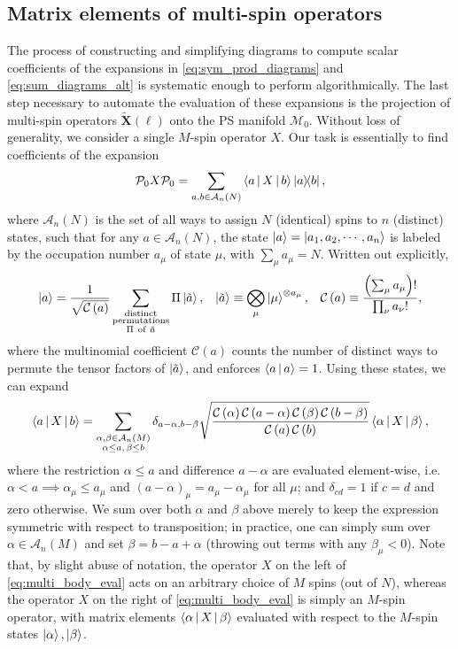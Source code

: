 \documentclass[nofootinbib,notitlepage,11pt]{revtex4-2}
\renewcommand{\t}{\text} %
\newcommand{\f}[2]{\dfrac{#1}{#2}} %
\newcommand{\p}[1]{\left(#1\right)} %
\newcommand{\bk}{\Braket} %
\newcommand{\m}{\bm} %
\newcommand{\1}{\mathds{1}}
\newcommand{\A}{\mathcal{A}}
\newcommand{\C}{\mathcal{C}}
\newcommand{\M}{\mathcal{M}}
\renewcommand{\P}{\mathcal{P}}
\newcommand{\ot}{\widetilde}
\begin{document}
\subsection{Matrix elements of multi-spin operators}

The process of constructing and simplifying diagrams to compute scalar
coefficients of the expansions in \eqref{eq:sym_prod_diagrams} and
\eqref{eq:sum_diagrams_alt} is systematic enough to perform
algorithmically.  The last step necessary to automate the evaluation
of these expansions is the projection of multi-spin operators
$\ot{\m X}\p{\ell}$ onto the PS manifold $\M_0$.  Without loss of
generality, we consider a single $M$-spin operator $X$.  Our task is
essentially to find coefficients of the expansion
\begin{align}
  \P_0 X \P_0
  = \sum_{a,b\in\A_n\p{N}} \bk{a|X|b} \op{a}{b},
\end{align}
where $\A_n\p{N}$ is the set of all ways to assign $N$ (identical)
spins to $n$ (distinct) states, such that for any $a\in\A_n\p{N}$, the
state $\ket{a}=\ket{a_1,a_2,\cdots,a_n}$ is labeled by the occupation
number $a_\mu$ of state $\mu$, with $\sum_\mu a_\mu = N$.  Written out
explicitly,
\begin{align}
  \ket{a} = \f1{\sqrt{\C\p{a}}}
  \sum_{\substack{\t{distinct}\\\t{permutations}\\\Pi~\t{of}~\tilde a}}
  \Pi \ket{\tilde a},
  &&
  \ket{\tilde a} \equiv \bigotimes_\mu \ket{\mu}^{\otimes a_\mu},
  &&
  \C\p{a} \equiv \f{\p{\sum_\mu a_\mu}!}{\prod_\nu a_\nu!},
\end{align}
where the multinomial coefficient $\C\p{a}$ counts the number of
distinct ways to permute the tensor factors of $\ket{\tilde a}$, and
enforces $\bk{a|a}=1$.  Using these states, we can expand
\begin{align}
  \bk{a|X|b}
  = \sum_{\substack{\alpha,\beta\in\A_n\p{M}\\\alpha\le a,\,\beta\le b}}
  \delta_{a-\alpha,b-\beta}
  \sqrt{\f{\C\p{\alpha}\C\p{a-\alpha}\C\p{\beta}\C\p{b-\beta}}
    {\C\p{a}\C\p{b}}}
  \bk{\alpha|X|\beta},
  \label{eq:multi_body_eval}
\end{align}
where the restriction $\alpha\le a$ and difference $a-\alpha$ are
evaluated element-wise, i.e.~$\alpha<a\implies \alpha_\mu\le a_\mu$
and $\p{a-\alpha}_\mu=a_\mu-\alpha_\mu$ for all $\mu$; and
$\delta_{cd}=1$ if $c=d$ and zero otherwise.  We sum over both
$\alpha$ and $\beta$ above merely to keep the expression symmetric
with respect to transposition; in practice, one can simply sum over
$\alpha\in\A_n\p{M}$ and set $\beta=b-a+\alpha$ (throwing out terms
with any $\beta_\mu<0$).  Note that, by slight abuse of notation, the
operator $X$ on the left of \eqref{eq:multi_body_eval} acts on an
arbitrary choice of $M$ spins (out of $N$), whereas the operator $X$
on the right of \eqref{eq:multi_body_eval} is simply an $M$-spin
operator, with matrix elements $\bk{\alpha|X|\beta}$ evaluated with
respect to the $M$-spin states $\ket\alpha,\ket\beta$.
\end{document}
